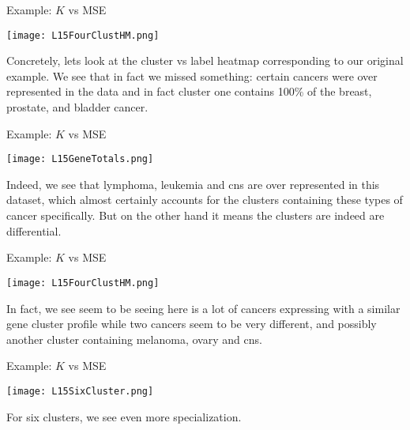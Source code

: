 \documentclass[10pt, table, dvipsnames,xcdraw,handout]{beamer}
\begin{document}
\begin{frame}[fragile]{Example: $K$ vs MSE}
  \begin{minipage}[t][0.5\textheight][t]{\textwidth}
	\centering \texttt{[image: L15FourClustHM.png]} 
  \end{minipage}
  \vfill
\begin{minipage}[t][0.5\textheight][t]{\textwidth}
Concretely, lets look at the cluster vs label heatmap corresponding to our original example.  We see that in fact we missed something: certain cancers were over represented in the data and in fact cluster one contains 100\% of the breast, prostate, and bladder cancer.
\end{minipage}
\end{frame}




\begin{frame}[fragile]{Example: $K$ vs MSE}
  \begin{minipage}[t][0.5\textheight][t]{\textwidth}
	\centering \texttt{[image: L15GeneTotals.png]} 
  \end{minipage}
  \vfill
\begin{minipage}[t][0.5\textheight][t]{\textwidth}
Indeed, we see that lymphoma, leukemia and cns are over represented in this dataset, which almost certainly accounts for the  clusters containing these types of cancer specifically. \pause But on the other hand it means the clusters are indeed are differential.
\end{minipage}
\end{frame}



\begin{frame}[fragile]{Example: $K$ vs MSE}
  \begin{minipage}[t][0.5\textheight][t]{\textwidth}
	\centering \texttt{[image: L15FourClustHM.png]} 
  \end{minipage}
  \vfill
\begin{minipage}[t][0.5\textheight][t]{\textwidth}
In fact, we see seem to be seeing here is a lot of cancers expressing with a similar gene cluster profile while two cancers seem to be very different, and possibly another cluster containing melanoma, ovary and cns. 
\end{minipage}
\end{frame}



\begin{frame}[fragile]{Example: $K$ vs MSE}
  \begin{minipage}[t][0.5\textheight][t]{\textwidth}
	\centering \texttt{[image: L15SixCluster.png]} 
  \end{minipage}
  \vfill
\begin{minipage}[t][0.5\textheight][t]{\textwidth}
For six clusters, we see even more specialization. 
\end{minipage}
\end{frame}
\end{document}

